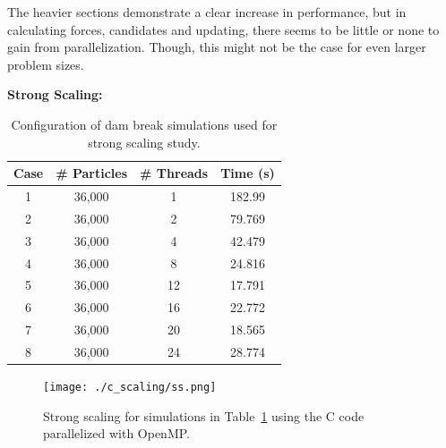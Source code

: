 \documentclass{scrartcl}
\begin{document}
    The heavier sections demonstrate a clear increase in performance, but in calculating forces, candidates and updating, there seems to be little or none to gain from parallelization. Though, this might not be the case for even larger problem sizes.
    
    \textbf{Strong Scaling:}
    \begin{table}
    	\begin{center}
    		\begin{tabular}{| c | c | c | c |}
    			\hline
    			Case & \# Particles & \# Threads & Time (s) \\ \hline		  		
    			1 & 36,000 &  1 & 182.99 \\ \hline		  		
    			2 & 36,000 &  2 & 79.769 \\ \hline		  		
    			3 & 36,000 &  4 & 42.479 \\ \hline		  		
    			4 & 36,000 &  8 & 24.816 \\ \hline		  		
    			5 & 36,000 & 12 & 17.791 \\ \hline		  		
    			6 & 36,000 & 16 & 22.772 \\ \hline		  		
    			7 & 36,000 & 20 & 18.565 \\ \hline		  		
    			8 & 36,000 & 24 & 28.774 \\ \hline		  		
    		\end{tabular}
    		\caption{Configuration of dam break simulations used for strong scaling study.}
    		\label{tab:css}
    	\end{center}
    \end{table}
    
    \begin{figure}
    	\begin{center}
    		\texttt{[image: ./c\_scaling/ss.png]}
    		\caption{Strong scaling for simulations in Table~\ref{tab:css} using the C code parallelized with OpenMP.}
    		\label{fig:ss_c_omp}
    	\end{center}
    \end{figure}
    
\end{document}
